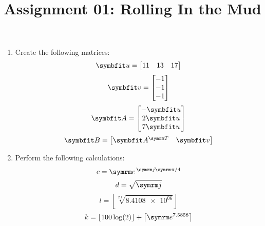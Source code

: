 \documentclass{article}
\title{Assignment 01: Rolling In the Mud}
\begin{document}
\renderTitle

\begin{enumerate}[leftmargin=*]
	\item
		Create the following matrices:
		\begin{equation}
			\mat{u} =
			\begin{bmatrix}
				11 & 13 & 17
			\end{bmatrix}
		\end{equation}
		\begin{equation}
			\mat{v} =
			\begin{bmatrix}
				-1 \\
				-1 \\
				-1 \\
			\end{bmatrix}
		\end{equation}
		\begin{equation}
			\mat{A} =
			\begin{bmatrix}
				-\mat{u} \\
				2\mat{u} \\
				7\mat{u} \\
			\end{bmatrix}
		\end{equation}
		\begin{equation}
			\mat{B} =
			\begin{bmatrix}
				\mat{A}^\T & \mat{v}
			\end{bmatrix}
		\end{equation}

	\item
		Perform the following calculations:
		\begin{equation}
			c = \e^{\,\im\cpi / 4}
		\end{equation}
		\begin{equation}
			d = \sqrt{\im}
		\end{equation}
		\begin{equation}
			l
			=
			\left\lfloor
			\sqrt[2.1]{\num{8.4108e+06}}
			\right\rfloor
		\end{equation}
		\begin{equation}
			k
			=
			\lfloor100\log(2)\rfloor
			+
			\left\lceil\e^{7.5858}\right\rceil
		\end{equation}
\end{enumerate}
\end{document}
